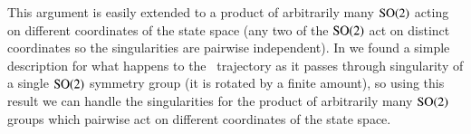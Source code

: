 This argument is easily extended to a product of arbitrarily many
$\textrm{SO}(2)$ acting on different coordinates of the state space (any two of
the $\textrm{SO}(2)$ act on distinct coordinates so the singularities are
pairwise independent). In  we found a simple
description for what happens to the \reducedsp\ trajectory as it passes
through singularity of a single $\textrm{SO}(2)$ symmetry group (it is rotated
by a finite amount), so using this result we can handle the singularities
for the product of arbitrarily many $\textrm{SO}(2)$ groups which pairwise act
on different coordinates of the state space.
